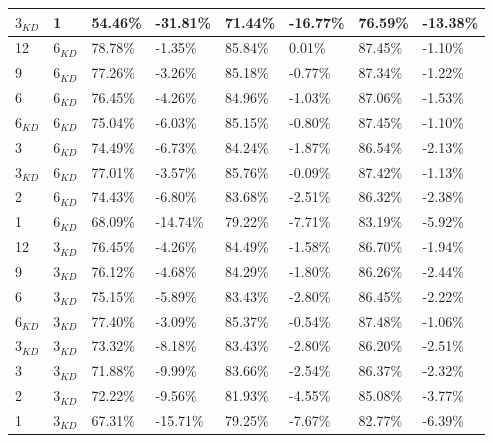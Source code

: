 \begin{table}[!htb]
{\begin{tabular}{|l|l|l|l|l|l|l|l|}
        $3_{KD}$ & 1 & 54.46\% & -31.81\% & 71.44\% & -16.77\% & 76.59\% & -13.38\% \\ \hline
        \midrule
        12 & $6_{KD}$ & 78.78\% & -1.35\% & 85.84\% & 0.01\% & 87.45\% & -1.10\% \\ \hline
        9 & $6_{KD}$ & 77.26\% & -3.26\% & 85.18\% & -0.77\% & 87.34\% & -1.22\% \\ \hline
        6 & $6_{KD}$ & 76.45\% & -4.26\% & 84.96\% & -1.03\% & 87.06\% & -1.53\% \\ \hline
        $6_{KD}$ & $6_{KD}$ & 75.04\% & -6.03\% & 85.15\% & -0.80\% & 87.45\% & -1.10\% \\ \hline
        3 & $6_{KD}$ & 74.49\% & -6.73\% & 84.24\% & -1.87\% & 86.54\% & -2.13\% \\ \hline
        $3_{KD}$ & $6_{KD}$ & 77.01\% & -3.57\% & 85.76\% & -0.09\% & 87.42\% & -1.13\% \\ \hline
        2 & $6_{KD}$ & 74.43\% & -6.80\% & 83.68\% & -2.51\% & 86.32\% & -2.38\% \\ \hline
        1 & $6_{KD}$ & 68.09\% & -14.74\% & 79.22\% & -7.71\% & 83.19\% & -5.92\% \\ \hline
        \midrule
        12 & $3_{KD}$ & 76.45\% & -4.26\% & 84.49\% & -1.58\% & 86.70\% & -1.94\% \\ \hline
        9 & $3_{KD}$ & 76.12\% & -4.68\% & 84.29\% & -1.80\% & 86.26\% & -2.44\% \\ \hline
        6 & $3_{KD}$ & 75.15\% & -5.89\% & 83.43\% & -2.80\% & 86.45\% & -2.22\% \\ \hline
        $6_{KD}$ & $3_{KD}$ & 77.40\% & -3.09\% & 85.37\% & -0.54\% & 87.48\% & -1.06\% \\ \hline
        $3_{KD}$ & $3_{KD}$ & 73.32\% & -8.18\% & 83.43\% & -2.80\% & 86.20\% & -2.51\% \\ \hline
        3 & $3_{KD}$ & 71.88\% & -9.99\% & 83.66\% & -2.54\% & 86.37\% & -2.32\% \\ \hline
        2 & $3_{KD}$ & 72.22\% & -9.56\% & 81.93\% & -4.55\% & 85.08\% & -3.77\% \\ \hline
        1 & $3_{KD}$ & 67.31\% & -15.71\% & 79.25\% & -7.67\% & 82.77\% & -6.39\% \\ \hline
    \end{tabular}}
    \label{tab:asym-nq-kd}
\end{table}
